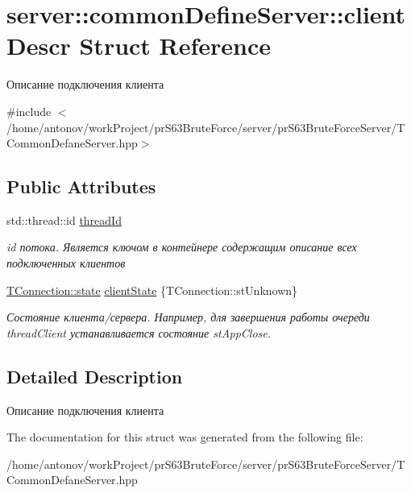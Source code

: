\hypertarget{structserver_1_1common_define_server_1_1client_descr}{}\section{server\+:\+:common\+Define\+Server\+:\+:client\+Descr Struct Reference}
\label{structserver_1_1common_define_server_1_1client_descr}


Описание подключения клиента  




{\ttfamily \#include $<$/home/antonov/work\+Project/pr\+S63\+Brute\+Force/server/pr\+S63\+Brute\+Force\+Server/\+T\+Common\+Defane\+Server.\+hpp$>$}

\subsection*{Public Attributes}
\begin{DoxyCompactItemize}
\item 
\mbox{\label{structserver_1_1common_define_server_1_1client_descr_a301f7746deb69a26ca72ccce330446c1}} 
std\+::thread\+::id \hyperlink{structserver_1_1common_define_server_1_1client_descr_a301f7746deb69a26ca72ccce330446c1}{thread\+Id}
\begin{DoxyCompactList}\small\item\em id потока. Является ключом в контейнере содержащим описание всех подключенных клиентов \end{DoxyCompactList}\item 
\mbox{\label{structserver_1_1common_define_server_1_1client_descr_ac1848551f1c55e31df4cd4ed4ad25282}} 
\hyperlink{classconnection_1_1_t_connection_aee7dfb7510592bd2697ab6f906b9612c}{T\+Connection\+::state} \hyperlink{structserver_1_1common_define_server_1_1client_descr_ac1848551f1c55e31df4cd4ed4ad25282}{client\+State} \{T\+Connection\+::st\+Unknown\}
\begin{DoxyCompactList}\small\item\em Состояние клиента/сервера. Например, для завершения работы очереди thread\+Client устанавливается состояние st\+App\+Close. \end{DoxyCompactList}\end{DoxyCompactItemize}


\subsection{Detailed Description}
Описание подключения клиента 

The documentation for this struct was generated from the following file\+:\begin{DoxyCompactItemize}
\item 
/home/antonov/work\+Project/pr\+S63\+Brute\+Force/server/pr\+S63\+Brute\+Force\+Server/T\+Common\+Defane\+Server.\+hpp\end{DoxyCompactItemize}
